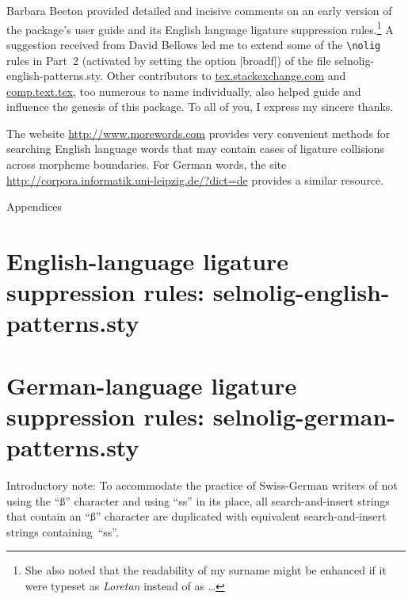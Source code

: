 \documentclass[11pt]{article}
\newcommand{\pkg}[1]{\textsf{#1}}
\newcommand{\cmmd}[1]{\texttt{\textbackslash #1}}
\let\oldappendix\appendix
\renewcommand\appendix{%
   \addtocontents{toc}{\protect{\vspace{1\baselineskip}}}
   \addtocontents{toc}{\protect{\mdseries Appendices\par}}
   \noindent
   {\Large Appendices}
   \oldappendix}
\begin{document}
Barbara Beeton provided detailed and incisive comments on an early version of the package's user guide and its English language ligature suppression rules.\footnote{She also noted that the readability of my surname might be enhanced if it were typeset as \emph{Loretan} instead of as \emph{}\dots} A suggestion received from David Bellows led me to extend some of the \cmmd{nolig} rules in Part~2 (activated by setting the option |broadf|) of the file \pkg{selnolig-english-patterns.sty}. Other contributors to \url{tex.stackexchange.com} and \url{comp.text.tex}, too numerous to name individually, also helped guide and influence the genesis of this package. To all of you, I express my sincere thanks.

The website \url{http://www.morewords.com} provides very convenient methods for searching English language words that may contain cases of ligature collisions across morpheme boundaries. For German words, the site \url{http://corpora.informatik.uni-leipzig.de/?dict=de} provides a similar resource. 


\clearpage
\appendix
\selnoligoff  %


\small %


\section[English-language ligature suppression rules: selnolig-english-patterns.sty]{English-language ligature suppression rules: 
\pkg{selnolig-english-patterns.sty}}
\label{sec:eng-listing}

\begin{multicols}{2}
\end{multicols}

\clearpage
\section[German-language ligature suppression rules:
selnolig-german-patterns.sty]{German-language ligature suppression rules: \pkg{selnolig-german-patterns.sty}}
\label{sec:germ-listing}

Introductory note: To accommodate the practice of Swiss-German writers of not using the \enquote{ß} character and using \enquote{ss} in its place, all search-and-insert strings that contain an \enquote{ß} character are duplicated with equivalent search-and-insert strings containing~\enquote{ss}.
\end{document}
